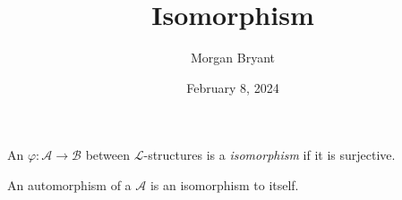 \documentclass[a4paper]{article}
\title{Isomorphism}
\date{February 8, 2024}
\author{Morgan Bryant}
\begin{document}
\maketitle
\par{An  \(\varphi :  \mathcal {A}  \rightarrow   \mathcal {B}\) between \(\mathcal {L}\)-structures is a \emph{isomorphism} if it is surjective.

An automorphism of a  \(\mathcal {A}\) is an isomorphism to itself.
}
\printbibliography
\end{document}

